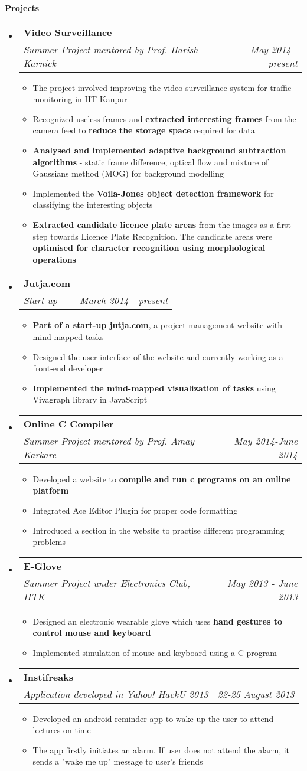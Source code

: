 \documentclass[letterpaper,9pt]{extarticle}
\makeatletter
\newcommand{\resitem}[1]{\item #1 \vspace{-2pt}}
\newcommand{\resheading}[1]{{\large \colorbox{mygrey}{\begin{minipage}{\textwidth}{\textbf{#1 \vphantom{p\^{E}}}}\end{minipage}}}}
\newcommand{\ressubheading}[4]{
\begin{tabular*}{6.5in}{l@{\extracolsep{\fill}}r}
		\textbf{#1} & #2 \\
		\textit{#3} & \textit{#4} \\
\end{tabular*}\vspace{-6pt}}
\makeatother
\begin{document}
\resheading{Projects}
\begin{itemize}
\item
	\ressubheading{Video Surveillance}{}{Summer Project mentored by Prof. Harish Karnick}{May 2014 - present}
	\begin{itemize}
		\resitem{The project involved improving the video surveillance system for traffic monitoring in IIT Kanpur}
		\resitem{Recognized useless frames and \textbf{extracted interesting frames} from the camera feed to \textbf{reduce the storage space} required for data }
		\resitem{\textbf{Analysed and implemented adaptive background subtraction algorithms} - static frame difference, optical flow and mixture of Gaussians method (MOG) for background modelling}
		\resitem{Implemented the \textbf{Voila-Jones object detection framework} for classifying the interesting objects}		
		\resitem{\textbf{Extracted candidate licence plate areas} from the images as a first step towards Licence Plate Recognition. The candidate areas were \textbf{optimised for character recognition using morphological operations}}
	\end{itemize}
\item
	\ressubheading{Jutja.com}{}{Start-up}{March 2014 - present}
	\begin{itemize}
		\resitem{\textbf{Part of a start-up jutja.com}, a project management website with mind-mapped tasks}
		\resitem{Designed the user interface of the website and currently working as a front-end developer}
		\resitem{\textbf{Implemented the mind-mapped visualization of tasks} using Vivagraph library in JavaScript}
	\end{itemize}
\item
	\ressubheading{Online C Compiler}{}{Summer Project mentored by Prof. Amay Karkare}{May 2014-June 2014}
	\begin{itemize}
		\resitem{Developed a website to \textbf{compile and run c programs on an online platform}}
		\resitem{Integrated Ace Editor Plugin for proper code formatting}
		\resitem{Introduced a section in the website to practise different programming problems}
	\end{itemize}
\item
	\ressubheading{E-Glove}{}{Summer Project under Electronics Club, IITK}{May 2013 - June 2013}
	\begin{itemize}
		\resitem{Designed an electronic wearable glove which uses \textbf{hand gestures to control mouse and keyboard}}
		\resitem{Implemented simulation of mouse and keyboard using a C program}
	\end{itemize}
\item
	\ressubheading{Instifreaks}{}{Application developed in Yahoo! HackU 2013}{22-25 August 2013}
	\begin{itemize}
		\resitem{Developed an android reminder app to wake up the user to attend lectures on time}
		\resitem{The app firstly initiates an alarm. If user does not attend the alarm, it sends a "wake me up" message to user’s friends}
	\end{itemize}
\end{itemize}
\end{document}
